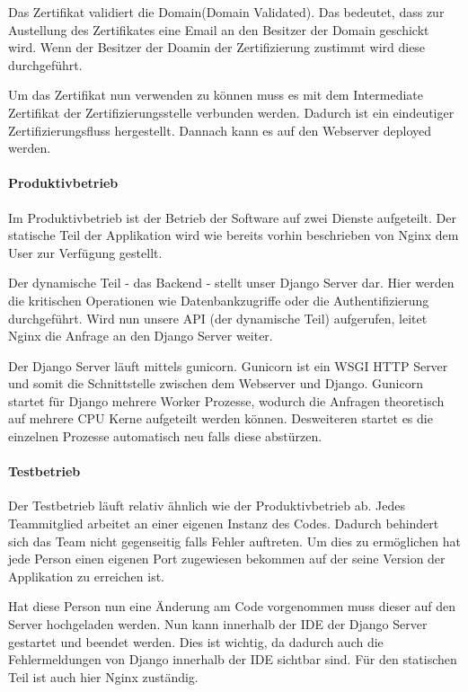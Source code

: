 Das Zertifikat validiert die Domain(Domain Validated). Das bedeutet, dass zur Austellung des Zertifikates eine Email an den Besitzer der Domain geschickt wird. Wenn der Besitzer der Doamin der Zertifizierung zustimmt wird diese durchgeführt. 

Um das Zertifikat nun verwenden zu können muss es mit dem Intermediate Zertifikat der Zertifizierungsstelle verbunden werden. Dadurch ist ein eindeutiger Zertifizierungsfluss hergestellt. Dannach kann es auf den Webserver deployed werden.
   
\paragraph{Produktivbetrieb}
Im Produktivbetrieb ist der Betrieb der Software auf zwei Dienste aufgeteilt. Der statische Teil der Applikation wird wie bereits vorhin beschrieben von Nginx dem User zur Verfügung gestellt. 

Der dynamische Teil - das Backend - stellt unser Django Server dar. Hier werden die kritischen Operationen wie Datenbankzugriffe oder die Authentifizierung durchgeführt. Wird nun unsere \gls{API} (der dynamische Teil) aufgerufen, leitet Nginx die Anfrage an den Django Server weiter. \\


Der Django Server läuft mittels gunicorn. Gunicorn ist ein \gls{WSGI} HTTP Server und somit die Schnittstelle zwischen dem Webserver und Django. Gunicorn startet für Django mehrere Worker Prozesse, wodurch die Anfragen theoretisch auf mehrere CPU Kerne aufgeteilt werden können. Desweiteren startet es die einzelnen Prozesse automatisch neu falls diese abstürzen.
\paragraph{Testbetrieb}
Der Testbetrieb läuft relativ ähnlich wie der Produktivbetrieb ab. Jedes Teammitglied arbeitet an einer eigenen Instanz des Codes. Dadurch behindert sich das Team nicht gegenseitig falls Fehler auftreten. Um dies zu ermöglichen hat jede Person einen eigenen Port zugewiesen bekommen auf der seine Version der Applikation zu erreichen ist. 

Hat diese Person nun eine Änderung am Code vorgenommen muss dieser auf den Server hochgeladen werden. Nun kann innerhalb der IDE der Django Server gestartet und beendet werden. Dies ist wichtig, da dadurch auch die Fehlermeldungen von Django innerhalb der \gls{IDE} sichtbar sind. Für den statischen Teil ist auch hier Nginx zuständig.

